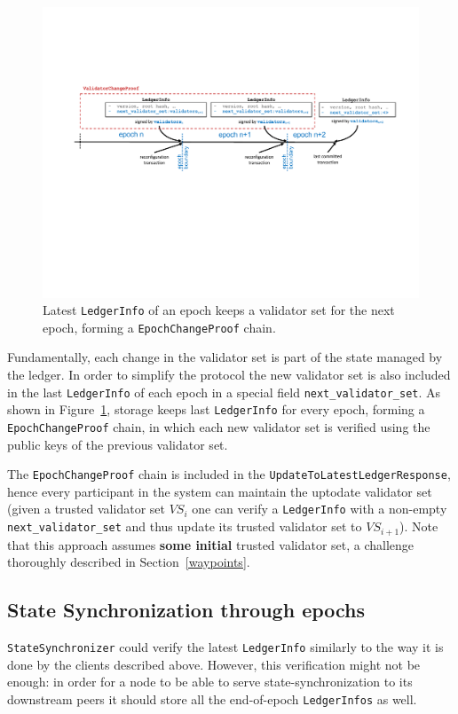 \documentclass[letterpaper,10pt]{article}
\begin{document}
\begin{figure}[ht]
	\centering
	\includegraphics[width=\textwidth]{figures/ledger-store.pdf}
	\caption{\footnotesize{Latest \texttt{LedgerInfo} of an epoch keeps a validator set for the next epoch, forming a \texttt{EpochChangeProof} chain.}}
	\label{fig:ledger-store}
\end{figure}

Fundamentally, each change in the validator set is part of the state managed by the ledger. In order to simplify the protocol the new validator set is also included in the last \texttt{LedgerInfo} of each epoch in a special field \texttt{next\_validator\_set}. As shown in Figure~\ref{fig:ledger-store}, storage keeps last \texttt{LedgerInfo} for every epoch, forming a \texttt{EpochChangeProof} chain, in which each new validator set is verified using the public keys of the previous validator set.

The \texttt{EpochChangeProof} chain is included in the \texttt{UpdateToLatestLedgerResponse}, hence every participant in the system can maintain the uptodate validator set (given a trusted validator set $VS_i$ one can verify a \texttt{LedgerInfo} with a non-empty \texttt{next\_validator\_set} and thus update its trusted validator set to $VS_{i+1}$). Note that this approach assumes \textbf{some initial} trusted validator set, a challenge thoroughly described in Section~\ref{waypoints}.

\subsection{State Synchronization through epochs}
\label{state-sync-epochs}
\texttt{StateSynchronizer} could verify the latest \texttt{LedgerInfo} similarly to the way it is done by the clients described above. However, this verification might not be enough: in order for a node to be able to serve state-synchronization to its downstream peers it should store all the end-of-epoch \texttt{LedgerInfos} as well.
\end{document}
